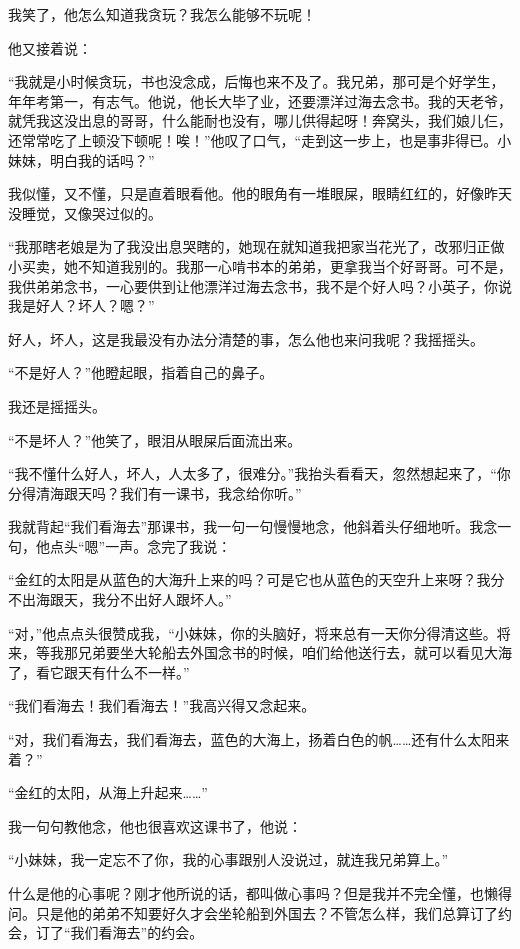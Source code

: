 \par 我笑了，他怎么知道我贪玩？我怎么能够不玩呢！
\par 他又接着说：
\par “我就是小时候贪玩，书也没念成，后悔也来不及了。我兄弟，那可是个好学生，年年考第一，有志气。他说，他长大毕了业，还要漂洋过海去念书。我的天老爷，就凭我这没出息的哥哥，什么能耐也没有，哪儿供得起呀！奔窝头，我们娘儿仨，还常常吃了上顿没下顿呢！唉！”他叹了口气，“走到这一步上，也是事非得已。小妹妹，明白我的话吗？”
\par 我似懂，又不懂，只是直着眼看他。他的眼角有一堆眼屎，眼睛红红的，好像昨天没睡觉，又像哭过似的。
\par “我那瞎老娘是为了我没出息哭瞎的，她现在就知道我把家当花光了，改邪归正做小买卖，她不知道我别的。我那一心啃书本的弟弟，更拿我当个好哥哥。可不是，我供弟弟念书，一心要供到让他漂洋过海去念书，我不是个好人吗？小英子，你说我是好人？坏人？嗯？”
\par 好人，坏人，这是我最没有办法分清楚的事，怎么他也来问我呢？我摇摇头。
\par “不是好人？”他瞪起眼，指着自己的鼻子。
\par 我还是摇摇头。
\par “不是坏人？”他笑了，眼泪从眼屎后面流出来。
\par “我不懂什么好人，坏人，人太多了，很难分。”我抬头看看天，忽然想起来了，“你分得清海跟天吗？我们有一课书，我念给你听。”
\par 我就背起“我们看海去”那课书，我一句一句慢慢地念，他斜着头仔细地听。我念一句，他点头“嗯”一声。念完了我说：
\par “金红的太阳是从蓝色的大海升上来的吗？可是它也从蓝色的天空升上来呀？我分不出海跟天，我分不出好人跟坏人。”
\par “对，”他点点头很赞成我，“小妹妹，你的头脑好，将来总有一天你分得清这些。将来，等我那兄弟要坐大轮船去外国念书的时候，咱们给他送行去，就可以看见大海了，看它跟天有什么不一样。”
\par “我们看海去！我们看海去！”我高兴得又念起来。
\par “对，我们看海去，我们看海去，蓝色的大海上，扬着白色的帆……还有什么太阳来着？”
\par “金红的太阳，从海上升起来……”
\par 我一句句教他念，他也很喜欢这课书了，他说：
\par “小妹妹，我一定忘不了你，我的心事跟别人没说过，就连我兄弟算上。”
\par 什么是他的心事呢？刚才他所说的话，都叫做心事吗？但是我并不完全懂，也懒得问。只是他的弟弟不知要好久才会坐轮船到外国去？不管怎么样，我们总算订了约会，订了“我们看海去”的约会。





